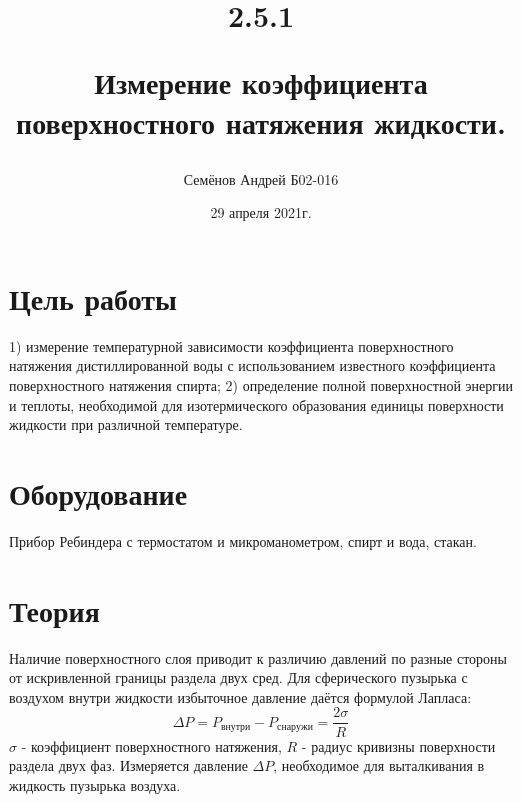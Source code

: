 \documentclass[a4paper, 12pt]{article}
\title{
2.5.1 

Измерение коэффициента поверхностного натяжения жидкости.
\author{Семёнов Андрей Б02-016}
}
\date{29 апреля 2021г.}
\begin{document}
	\maketitle
	\section*{Цель работы}
		1) измерение температурной зависимости  коэффициента поверхностного натяжения дистиллированной воды с использованием известного коэффициента поверхностного натяжения спирта;  2) определение полной поверхностной энергии  и теплоты, необходимой для изотермического образования единицы  поверхности жидкости  при различной температуре.
	\section*{Оборудование}
		Прибор Ребиндера с термостатом и микроманометром, спирт и вода, стакан.
	\section*{Теория}
		Наличие поверхностного слоя приводит к различию давлений по разные стороны от искривленной границы раздела двух сред.  Для сферического пузырька с воздухом  внутри жидкости избыточное давление даётся формулой Лапласа: 
		$$\Delta P = P_{внутри} - P_{снаружи} = \frac{2 \sigma}{R}$$
		$\sigma$ - коэффициент поверхностного натяжения, $R$ - радиус кривизны поверхности раздела двух фаз. Измеряется давление $\Delta P$, необходимое для выталкивания в жидкость пузырька воздуха. 
\end{document}
